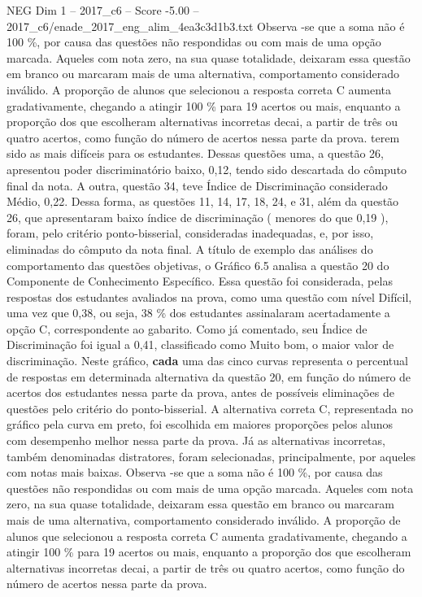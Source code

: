 \begin{textsample}{NEG Dim 1 – 2017\_c6 – Score -5.00 – 2017\_c6/enade\_2017\_eng\_alim\_4ea3c3d1b3.txt}
Observa -se que a soma não é 100 \%, por causa das questões não respondidas ou com mais de uma opção marcada.
Aqueles com nota zero, na sua quase totalidade, deixaram essa questão em branco ou marcaram mais de uma alternativa, comportamento considerado inválido.
A proporção de alunos que selecionou a resposta correta C aumenta gradativamente, chegando a atingir 100 \% para 19 acertos ou mais, enquanto a proporção dos que escolheram alternativas incorretas decai, a partir de três ou quatro acertos, como função do número de acertos nessa parte da prova. terem sido as mais difíceis para os estudantes.
Dessas questões uma, a questão 26, apresentou poder discriminatório baixo, 0,12, tendo sido descartada do cômputo final da nota.
A outra, questão 34, teve Índice de Discriminação considerado Médio, 0,22.
Dessa forma, as questões 11, 14, 17, 18, 24, e 31, além da questão 26, que apresentaram baixo índice de discriminação ( menores do que 0,19 ), foram, pelo critério ponto-bisserial, consideradas inadequadas, e, por isso, eliminadas do cômputo da nota final.
A título de exemplo das análises do comportamento das questões objetivas, o Gráfico 6.5 analisa a questão 20 do Componente de Conhecimento Específico.
Essa questão foi considerada, pelas respostas dos estudantes avaliados na prova, como uma questão com nível Difícil, uma vez que 0,38, ou seja, 38 \% dos estudantes assinalaram acertadamente a opção C, correspondente ao gabarito.
Como já comentado, seu Índice de Discriminação foi igual a 0,41, classificado como Muito bom, o maior valor de discriminação.
Neste gráfico, \textbf{cada} uma das cinco curvas representa o percentual de respostas em determinada alternativa da questão 20, em função do número de acertos dos estudantes nessa parte da prova, antes de possíveis eliminações de questões pelo critério do ponto-bisserial.
A alternativa correta C, representada no gráfico pela curva em preto, foi escolhida em maiores proporções pelos alunos com desempenho melhor nessa parte da prova.
Já as alternativas incorretas, também denominadas distratores, foram selecionadas, principalmente, por aqueles com notas mais baixas.
Observa -se que a soma não é 100 \%, por causa das questões não respondidas ou com mais de uma opção marcada.
Aqueles com nota zero, na sua quase totalidade, deixaram essa questão em branco ou marcaram mais de uma alternativa, comportamento considerado inválido.
A proporção de alunos que selecionou a resposta correta C aumenta gradativamente, chegando a atingir 100 \% para 19 acertos ou mais, enquanto a proporção dos que escolheram alternativas incorretas decai, a partir de três ou quatro acertos, como função do número de acertos nessa parte da prova.

\end{textsample}
